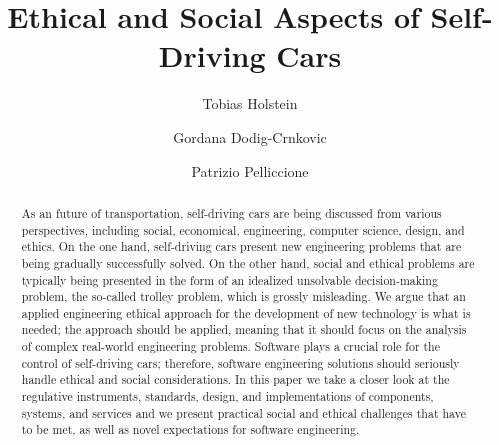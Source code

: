 \documentclass[sigconf,review, anonymous]{acmart}
\newcommand{\ugh}[1]{\textcolor{red}{\uwave{#1}}} %
\begin{document}
\title{Ethical and Social Aspects of Self-Driving Cars}




\author{Tobias Holstein}

\author{Gordana Dodig-Crnkovic}


\author{Patrizio Pelliccione}



\renewcommand{\shortauthors}{T. Holstein et al.}



\begin{acronym}
\end{acronym}





\begin{abstract}
As an \ugh{envisaged} future of transportation, self-driving cars are being discussed from various perspectives, including social, economical, engineering, computer science, design, and ethics. On the one hand, self-driving cars present new engineering problems that are being gradually successfully solved. On the other hand, social and ethical problems are typically being presented in the form of an idealized unsolvable decision-making problem, the so-called trolley problem, which is grossly misleading. We argue that an applied engineering ethical approach for the development of new technology is what is needed; the approach should be applied, meaning that it should focus on the analysis of complex real-world engineering problems. Software plays a crucial role for the control of self-driving cars; therefore, software engineering  solutions should seriously handle ethical and social considerations. 
In this paper we take a closer look at the regulative instruments, standards, design, and implementations of components, systems, and services and we present practical social and ethical challenges that have to be met, as well as novel expectations for software engineering.
\end{abstract}
\end{document}
